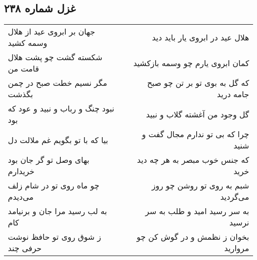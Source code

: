 \begin{center}
\section*{غزل شماره ۲۳۸}
\label{sec:sh238}
\begin{longtable}{l p{0.5cm} r}
جهان بر ابروی عید از هلال وسمه کشید
&&
هلال عید در ابروی یار باید دید
\\
شکسته گشت چو پشت هلال قامت من
&&
کمان ابروی یارم چو وسمه بازکشید
\\
مگر نسیم خطت صبح در چمن بگذشت
&&
که گل به بوی تو بر تن چو صبح جامه درید
\\
نبود چنگ و رباب و نبید و عود که بود
&&
گل وجود من آغشته گلاب و نبید
\\
بیا که با تو بگویم غم ملالت دل
&&
چرا که بی تو ندارم مجال گفت و شنید
\\
بهای وصل تو گر جان بود خریدارم
&&
که جنس خوب مبصر به هر چه دید خرید
\\
چو ماه روی تو در شام زلف می‌دیدم
&&
شبم به روی تو روشن چو روز می‌گردید
\\
به لب رسید مرا جان و برنیامد کام
&&
به سر رسید امید و طلب به سر نرسید
\\
ز شوق روی تو حافظ نوشت حرفی چند
&&
بخوان ز نظمش و در گوش کن چو مروارید
\\
\end{longtable}
\end{center}
